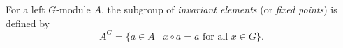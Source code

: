 For a left $G$-module $A$, the subgroup of \emph{invariant elements} (or \emph{fixed points}) is defined by
$$A^G = \{ a \in A \mid x \circ a = a \text{ for all } x \in G \}.$$
